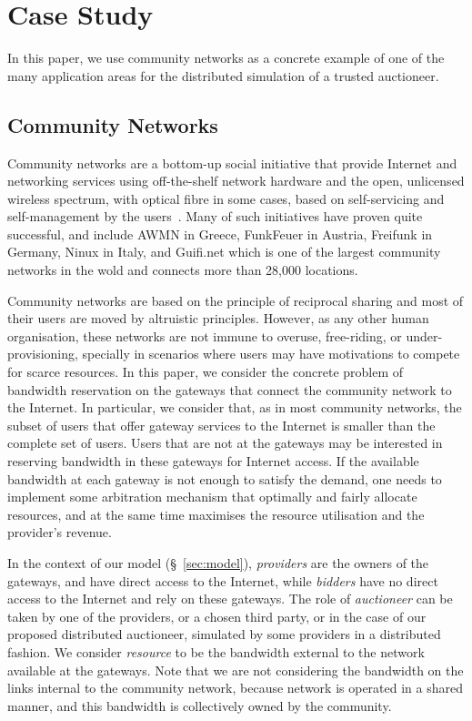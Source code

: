 
\section{Case Study}
\label{sec:instances}

In this paper, we use community networks as a concrete example of one of the many application areas for the distributed simulation of a trusted auctioneer.

\subsection{Community Networks}
Community networks are a bottom-up social initiative that provide Internet and networking services using off-the-shelf network hardware and the open, unlicensed wireless spectrum,
with optical fibre in some cases,
based on self-servicing and self-management by the users~\cite{Selimi2015Cloud}.  %
Many of such initiatives have proven quite successful, and 
	include AWMN in Greece, FunkFeuer in Austria, Freifunk in Germany, Ninux in Italy,
and Guifi.net which is one of the largest community networks in the wold and connects more than 28,000 locations.

Community networks are based on the principle of reciprocal sharing and most of their users are moved by altruistic principles. 
However, as any other human organisation, these networks are not immune to overuse, free-riding, or under-provisioning, specially in scenarios where users may have motivations to compete for scarce resources. 
In this paper, we consider the concrete problem of bandwidth reservation on the gateways that connect the community network to the Internet. 
In particular, we consider that, as in most community networks, the subset of users that offer gateway services to the Internet is smaller than the complete set of users. 
Users that are not at the gateways may be interested in reserving bandwidth in these gateways for Internet access.
If the available bandwidth at each gateway is not enough to satisfy the demand, 
one needs to implement some arbitration mechanism that optimally and fairly allocate resources, and at the same time maximises the resource utilisation and the provider's revenue. 

In the context of our model (\S~\ref{sec:model}), \emph{providers} are the owners of the gateways, and have direct access to the Internet,
while \emph{bidders} have no direct access to the Internet and rely on these gateways.
The role of \emph{auctioneer} can be taken by one of the providers, or a chosen third party,
or in the case of our proposed distributed auctioneer, simulated by some providers in a distributed fashion.
We consider \emph{resource} to be the bandwidth external to the network available at the gateways.
Note that we are not considering the bandwidth on the links internal to the community network,
because network is operated in a shared manner, 
and this bandwidth is collectively owned by the community.

